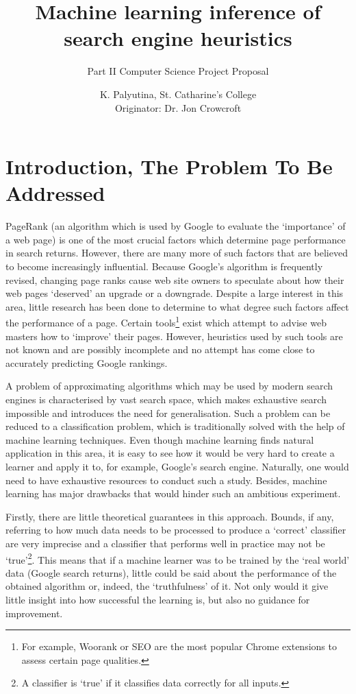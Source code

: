 

\title{Machine learning inference of search engine heuristics}
\subtitle{Part II Computer Science Project Proposal}
\author{K. Palyutina, St. Catharine's College \\
        Originator: Dr. Jon Crowcroft}



\section*{\bf Introduction, The Problem To Be Addressed}
PageRank (an algorithm which is used by Google to evaluate the `importance' of a web page) is one of the most crucial factors which determine page performance in search returns. However, there are many more of such factors that are believed to become increasingly influential. Because Google's algorithm is frequently revised, changing page ranks cause web site owners to speculate about how their web pages `deserved' an upgrade or a downgrade. Despite a large interest in this area, little research has been done to determine to what degree such factors affect the performance of a page. Certain tools\footnote{For example, Woorank or SEO are the most popular Chrome extensions to assess certain page qualities.} exist which attempt to advise web masters how to `improve' their pages. However, heuristics used by such tools are not known and are possibly incomplete and no attempt has come close to accurately predicting Google rankings.

A problem of approximating algorithms which may be used by modern search engines is characterised by vast search space, which makes exhaustive search impossible and introduces the need for generalisation. Such a problem can be reduced to a classification problem, which is traditionally solved with the help of machine learning techniques. Even though machine learning finds natural application in this area, it is easy to see how it would be very hard to create a learner and apply it to, for example, Google's search engine. Naturally, one would need to have exhaustive resources to conduct such a study. Besides, machine learning has major drawbacks that would hinder such an ambitious experiment.

Firstly, there are little theoretical guarantees in this approach. Bounds, if any, referring to how much data needs to be processed to produce a `correct' classifier are very imprecise and a classifier that performs well in practice may not be `true'\footnote{A classifier is `true' if it classifies data correctly for all inputs.}. This means that if a machine learner was to be trained by the `real world' data (Google search returns), little could be said about the performance of the obtained algorithm or, indeed, the `truthfulness' of it. Not only would it give little insight into how successful the learning is, but also no guidance for improvement. 

